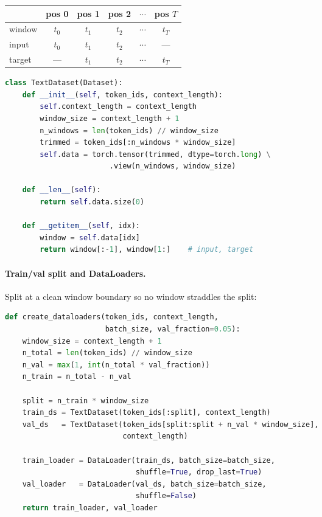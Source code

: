 \begin{center}
\begin{tabular}{lccccc}
\toprule
 & pos 0 & pos 1 & pos 2 & $\cdots$ & pos $T$ \\
\midrule
window & $t_0$ & $t_1$ & $t_2$ & $\cdots$ & $t_T$ \\
input  & $t_0$ & $t_1$ & $t_2$ & $\cdots$ & --- \\
target & ---   & $t_1$ & $t_2$ & $\cdots$ & $t_T$ \\
\bottomrule
\end{tabular}
\end{center}

\begin{lstlisting}[language=python, caption={TextDataset with shifted targets}]
class TextDataset(Dataset):
    def __init__(self, token_ids, context_length):
        self.context_length = context_length
        window_size = context_length + 1
        n_windows = len(token_ids) // window_size
        trimmed = token_ids[:n_windows * window_size]
        self.data = torch.tensor(trimmed, dtype=torch.long) \
                        .view(n_windows, window_size)

    def __len__(self):
        return self.data.size(0)

    def __getitem__(self, idx):
        window = self.data[idx]
        return window[:-1], window[1:]    # input, target
\end{lstlisting}

\paragraph{Train/val split and DataLoaders.}

Split at a clean window boundary so no window straddles the split:

\begin{lstlisting}[language=python, caption={Create DataLoaders}]
def create_dataloaders(token_ids, context_length,
                       batch_size, val_fraction=0.05):
    window_size = context_length + 1
    n_total = len(token_ids) // window_size
    n_val = max(1, int(n_total * val_fraction))
    n_train = n_total - n_val

    split = n_train * window_size
    train_ds = TextDataset(token_ids[:split], context_length)
    val_ds   = TextDataset(token_ids[split:split + n_val * window_size],
                           context_length)

    train_loader = DataLoader(train_ds, batch_size=batch_size,
                              shuffle=True, drop_last=True)
    val_loader   = DataLoader(val_ds, batch_size=batch_size,
                              shuffle=False)
    return train_loader, val_loader
\end{lstlisting}

